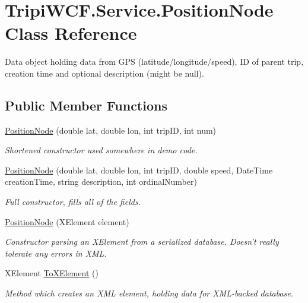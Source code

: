 \hypertarget{class_tripi_w_c_f_1_1_service_1_1_position_node}{
\section{TripiWCF.Service.PositionNode Class Reference}
\label{class_tripi_w_c_f_1_1_service_1_1_position_node}
}


Data object holding data from GPS (latitude/longitude/speed), ID of parent trip, creation time and optional description (might be null).  
\subsection*{Public Member Functions}
\begin{DoxyCompactItemize}
\item 
\hyperlink{class_tripi_w_c_f_1_1_service_1_1_position_node_a64485324d09216250cfeed79c7987ce7}{PositionNode} (double lat, double lon, int tripID, int num)
\begin{DoxyCompactList}\small\item\em Shortened constructor used somewhere in demo code. \item\end{DoxyCompactList}\item 
\hyperlink{class_tripi_w_c_f_1_1_service_1_1_position_node_a43c0c1c461f8f70565c95da1d3681fcc}{PositionNode} (double lat, double lon, int tripID, double speed, DateTime creationTime, string description, int ordinalNumber)
\begin{DoxyCompactList}\small\item\em Full constructor, fills all of the fields. \item\end{DoxyCompactList}\item 
\hyperlink{class_tripi_w_c_f_1_1_service_1_1_position_node_ab862d46452e5a7bafc91b045891a9a47}{PositionNode} (XElement element)
\begin{DoxyCompactList}\small\item\em Constructor parsing an XElement from a serialized database. Doesn't really tolerate any errors in XML. \item\end{DoxyCompactList}\item 
XElement \hyperlink{class_tripi_w_c_f_1_1_service_1_1_position_node_a229145b100cc00adfc119f4b254eb8e7}{ToXElement} ()
\begin{DoxyCompactList}\small\item\em Method which creates an XML element, holding data for XML-\/backed database. \item\end{DoxyCompactList}\end{DoxyCompactItemize}
